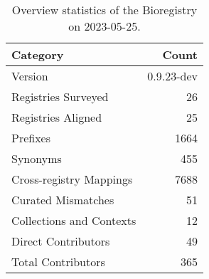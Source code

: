 \begin{table}
\caption{Overview statistics of the Bioregistry on 2023-05-25.}
\label{tab:bioregistry-summary}
\begin{tabular}{lr}
\toprule
Category & Count \\
\midrule
Version & 0.9.23-dev \\
Registries Surveyed & 26 \\
Registries Aligned & 25 \\
Prefixes & 1664 \\
Synonyms & 455 \\
Cross-registry Mappings & 7688 \\
Curated Mismatches & 51 \\
Collections and Contexts & 12 \\
Direct Contributors & 49 \\
Total Contributors & 365 \\
\bottomrule
\end{tabular}
\end{table}
